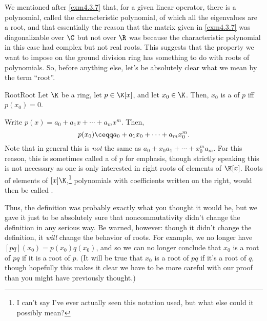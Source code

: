 We mentioned after \cref{exm4.3.7} that, for a given linear operator, there is a polynomial, called the characteristic polynomial, of which all the eigenvalues are a root, and that essentially the reason that the matrix given in \cref{exm4.3.7} was diagonalizable over $\C$ but not over $\R$ was because the characteristic polynomial in this case had complex but not real roots.  This suggests that the property we want to impose on the ground division ring has something to do with roots of polynomials.  So, before anything else, let's be absolutely clear what we mean by the term ``root''.
\begin{dfn}{Root}{Root}
	Let $\K$ be a ring, let $p\in \K [x]$, and let $x_0\in \K$.  Then, $x_0$ is a  of $p$ iff $p(x_0)=0$.
	\begin{rmk}
		Write $p(x)=a_0+a_1x+\cdots +a_mx^m$.  Then,
		\begin{equation}
			p(x_0)\ceqq a_0+a_1x_0+\cdots +a_mx_0^m.
		\end{equation}
		Note that in general this is \emph{not} the same as $a_0+x_0a_1+\cdots +x_0^ma_m$.  For this reason, this is sometimes called a  of $p$ for emphasis, though strictly speaking this is not necessary as one is only interested in right roots of elements of $\K [x]$.  Roots of elements of $[x]\K$\index[notation]{$[x]\K$},\footnote{I can't say I've ever actually seen this notation used, but what else could it possibly mean?} polynomials with coefficients written on the right, would then be called .  
	\end{rmk}
	\begin{rmk}
		Thus, the definition was probably exactly what you thought it would be, but we gave it just to be absolutely sure that noncommutativity didn't change the definition in any serious way.  Be warned, however:  though it didn't change the definition, it \emph{will} change the behavior of roots.  For example, we no longer have $[pq](x_0)=p(x_0)q(x_0)$, and so we can no longer conclude that $x_0$ is a root of $pq$ if it is a root of $p$.  (It will be true that $x_0$ is a root of $pq$ if it's a root of $q$, though hopefully this makes it clear we have to be more careful with our proof than you might have previously thought.)
	\end{rmk}
\end{dfn}
